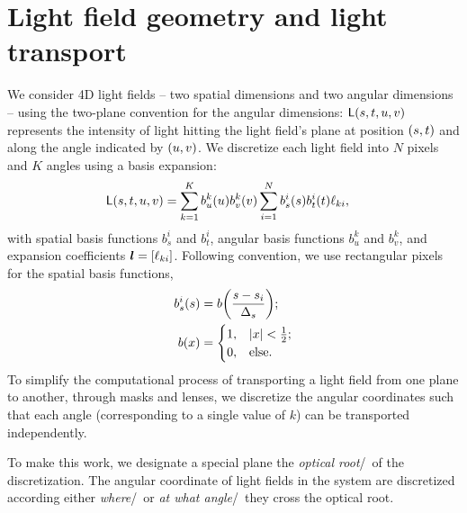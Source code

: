 \section{Light field geometry and light transport}

We consider 4D light fields -- two spatial dimensions and two angular
dimensions -- using the two-plane convention for the angular dimensions:
$\mathsf{L} {\left( s, t, u, v \right)}$ represents the intensity of light hitting the 
light field's plane at position $ {\left( s,t \right)}$ and along the angle indicated
by $ {\left( u,v \right)}$.  We discretize each light field into $N$ pixels and $K$ 
angles using a basis expansion:
\begin{align}
    \mathsf{L} {\left( s,t,u,v \right)}
    &=
    \sum_{k=1}^K b^k_u {\left( u \right)} b^k_v {\left( v \right)} 
    \sum_{i=1}^N b^i_s {\left( s \right)} b^i_t {\left( t \right)}
    \ell_{ki},
\end{align}
with spatial basis functions $b^i_s$ and $b^i_t$, angular basis 
functions $b^k_u$ and $b^k_v$, and expansion coefficients 
${\bm{l}} =  {\left[ \ell_{ki} \right] }$.  Following convention, we use rectangular
pixels for the spatial basis functions, \eg{}
\begin{align}
    b^i_s {\left( s \right)}
    &=
    b {\left( \frac{s - s_i}{\Delta_s} \right)};
    \nonumber \\
    b {\left( x \right)}
    &=
    \begin{cases}
        1, &  {\left| x \right| } < \frac{1}{2}; \\
        0, & \text{else.}
    \end{cases}
\end{align}
To simplify the computational process of transporting a light field from
one plane to another, through masks and lenses, we discretize the angular
coordinates such that each angle (corresponding to a single value of $k$)
can be transported independently.

To make this work, we designate a special plane the {\it optical root}/\ of
the discretization.  The angular coordinate of light fields in the system are
discretized according either {\it where}/\ or {\it at what angle}/\ they cross
the optical root.  


